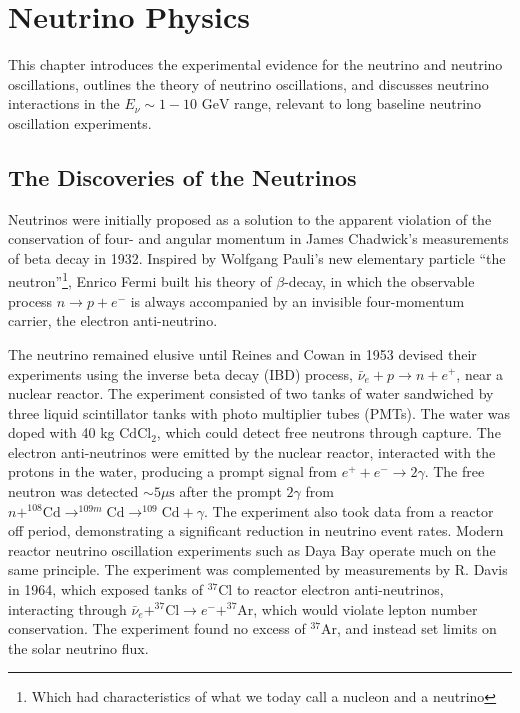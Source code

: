 \chapter{Neutrino Physics}
\label{chap:theory}
This chapter introduces the experimental evidence for the neutrino and neutrino oscillations, outlines the theory of neutrino oscillations, and discusses neutrino interactions in the $E_\nu\sim1-10 \text{ GeV}$ range, relevant to long baseline neutrino oscillation experiments.

\section{The Discoveries of the Neutrinos}
Neutrinos were initially proposed as a solution to the apparent violation of the conservation of four- and angular momentum in James Chadwick's measurements of beta decay in 1932\cite{Chadwick1,Chadwick2}. Inspired by Wolfgang Pauli's new elementary particle ``the neutron''\footnote{Which had characteristics of what we today call a nucleon and a neutrino}\cite{pauli_1933}, Enrico Fermi built his theory of $\beta$-decay\cite{fermi_1934}, in which the observable process $n \rightarrow p + e^-$ is always accompanied by an invisible four-momentum carrier, the electron anti-neutrino.

The neutrino remained elusive until Reines and Cowan in 1953 devised their experiments using the inverse beta decay (IBD) process, $\bar{\nu}_e + p \rightarrow n + e^+$, near a nuclear reactor\cite{reines_cowan_1,reines_cowan_2}. The experiment consisted of two tanks of water sandwiched by three liquid scintillator tanks with photo multiplier tubes (PMTs). The water was doped with 40 kg $\text{CdCl}_2$, which could detect free neutrons through capture. The electron anti-neutrinos were emitted by the nuclear reactor, interacted with the protons in the water, producing a prompt signal from $e^+ + e^- \rightarrow 2\gamma$. The free neutron was detected $\sim5\mu\text{s}$ after the prompt $2\gamma$ from $n + ^{108}\text{Cd} \rightarrow ^{109m}\text{Cd} \rightarrow ^{109}\text{Cd} + \gamma$. The experiment also took data from a reactor off period, demonstrating a significant reduction in neutrino event rates. Modern reactor neutrino oscillation experiments such as Daya Bay\cite{daya_bay} operate much on the same principle. The experiment was complemented by measurements by R. Davis  in 1964\cite{davis}, which exposed tanks of $^{37}\text{Cl}$ to reactor electron anti-neutrinos, interacting through $\bar{\nu}_e + ^{37}\text{Cl} \rightarrow e^- + ^{37}\text{Ar}$, which would violate lepton number conservation. The experiment found no excess of $^{37}\text{Ar}$, and instead set limits on the solar neutrino flux. 

